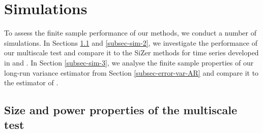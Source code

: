 
\section{Simulations}\label{sec-sim}


To assess the finite sample performance of our methods, we conduct a number of simulations. In Sections \ref{subsec-sim-1} and \ref{subsec-sim-2}, we investigate the performance of our multiscale test and compare it to the SiZer methods for time series developed in \cite{Rondonotti2004} and \cite{Rondonotti2007}. In Section \ref{subsec-sim-3}, we analyse the finite sample properties of our long-run variance estimator from Section \ref{subsec-error-var-AR} and compare it to the estimator of \cite{Hall2003}. 


\subsection{Size and power properties of the multiscale test}\label{subsec-sim-1} 


